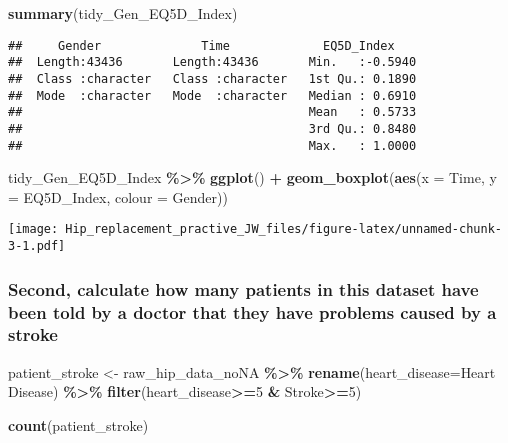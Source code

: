\documentclass[
]{article}
\newenvironment{Shaded}{\begin{snugshade}}{\end{snugshade}}
\newcommand{\AttributeTok}[1]{\textcolor[rgb]{0.13,0.29,0.53}{#1}}
\newcommand{\DecValTok}[1]{\textcolor[rgb]{0.00,0.00,0.81}{#1}}
\newcommand{\FunctionTok}[1]{\textcolor[rgb]{0.13,0.29,0.53}{\textbf{#1}}}
\newcommand{\NormalTok}[1]{#1}
\newcommand{\OtherTok}[1]{\textcolor[rgb]{0.56,0.35,0.01}{#1}}
\newcommand{\SpecialCharTok}[1]{\textcolor[rgb]{0.81,0.36,0.00}{\textbf{#1}}}
\newcommand{\StringTok}[1]{\textcolor[rgb]{0.31,0.60,0.02}{#1}}
\begin{document}
\begin{Shaded}
\begin{Highlighting}[]
\FunctionTok{summary}\NormalTok{(tidy\_Gen\_EQ5D\_Index)}
\end{Highlighting}
\end{Shaded}

\begin{verbatim}
##     Gender              Time             EQ5D_Index     
##  Length:43436       Length:43436       Min.   :-0.5940  
##  Class :character   Class :character   1st Qu.: 0.1890  
##  Mode  :character   Mode  :character   Median : 0.6910  
##                                        Mean   : 0.5733  
##                                        3rd Qu.: 0.8480  
##                                        Max.   : 1.0000
\end{verbatim}

\begin{Shaded}
\begin{Highlighting}[]
\NormalTok{tidy\_Gen\_EQ5D\_Index }\SpecialCharTok{\%\textgreater{}\%}
  \FunctionTok{ggplot}\NormalTok{() }\SpecialCharTok{+}
  \FunctionTok{geom\_boxplot}\NormalTok{(}\FunctionTok{aes}\NormalTok{(}\AttributeTok{x =}\NormalTok{ Time, }\AttributeTok{y =}\NormalTok{ EQ5D\_Index, }\AttributeTok{colour =}\NormalTok{ Gender)) }
\end{Highlighting}
\end{Shaded}

\texttt{[image: Hip\_replacement\_practive\_JW\_files/figure-latex/unnamed-chunk-3-1.pdf]}

\subsubsection{Second, calculate how many patients in this dataset have
been told by a doctor that they have problems caused by a
stroke}\label{second-calculate-how-many-patients-in-this-dataset-have-been-told-by-a-doctor-that-they-have-problems-caused-by-a-stroke}

\begin{Shaded}
\begin{Highlighting}[]
\NormalTok{patient\_stroke }\OtherTok{\textless{}{-}}\NormalTok{ raw\_hip\_data\_noNA }\SpecialCharTok{\%\textgreater{}\%} 
  \FunctionTok{rename}\NormalTok{(}\AttributeTok{heart\_disease=}\StringTok{\textquotesingle{}Heart Disease\textquotesingle{}}\NormalTok{) }\SpecialCharTok{\%\textgreater{}\%} 
  \FunctionTok{filter}\NormalTok{(heart\_disease}\SpecialCharTok{\textgreater{}=}\DecValTok{5} \SpecialCharTok{\&}\NormalTok{ Stroke}\SpecialCharTok{\textgreater{}=}\DecValTok{5}\NormalTok{) }

\FunctionTok{count}\NormalTok{(patient\_stroke)}
\end{Highlighting}
\end{Shaded}
\end{document}
